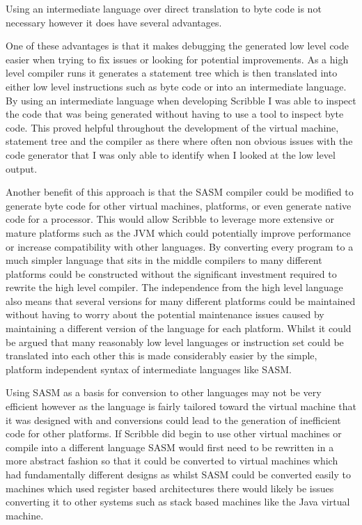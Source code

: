 \documentclass[]{final_report}
\begin{document}
Using an intermediate language over direct translation to byte code is not necessary however it does have several advantages.

One of these advantages is that it makes debugging the generated low level code easier when trying to fix issues or looking for potential improvements. As a high level compiler runs it generates a statement tree which is then translated into either low level instructions such as byte code or into an intermediate language. By using an intermediate language when developing Scribble I was able to inspect the code that was being generated without having to use a tool to inspect byte code. This proved helpful throughout the development of the virtual machine, statement tree and the compiler as there where often non obvious issues with the code generator that I was only able to identify when I looked at the low level output.

Another benefit of this approach is that the SASM compiler could be modified to generate byte code for other virtual machines, platforms, or even generate native code for a processor. This would allow Scribble to leverage more extensive or mature platforms such as the JVM which could potentially improve performance or increase compatibility with other languages. By converting every program to a much simpler language that sits in the middle compilers to many different platforms could be constructed without the significant investment required to rewrite the high level compiler. The independence from the high level language also means that several versions for many different platforms could be maintained without having to worry about the potential maintenance issues caused by maintaining a different version of the language for each platform. Whilst it could be argued that many reasonably low level languages or instruction set could be translated into each other this is made considerably easier by the simple, platform independent syntax of intermediate languages like SASM.

Using SASM as a basis for conversion to other languages may not be very efficient however as the language is fairly tailored toward the virtual machine that it was designed with and conversions could lead to the generation of inefficient code for other platforms. If Scribble did begin to use other virtual machines or compile into a different language SASM would first need to be rewritten in a more abstract fashion so that it could be converted to virtual machines which had fundamentally different designs as whilst SASM could be converted easily to machines which used register based architectures there would likely be issues converting it to other systems such as stack based machines like the Java virtual machine.
\end{document}
